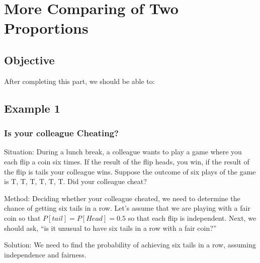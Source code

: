 \documentclass[11pt, chapterprefix=true]{scrbook}\usepackage[]{graphicx}\usepackage[]{color}
\begin{document}
\onecolumn



\chapter{More Comparing of Two Proportions} 

\label{chap:ch10}

\section{Objective}

After completing this part, we should be able to:

\vspace{1mm}



\section{Example 1}

\subsection{Is your colleague Cheating?}

Situation: During a lunch break, a colleague wants to play a game where you each flip a coin six times.  If the result of the flip heads, you win, if the result of the flip is tails your colleague wins.  Suppose the outcome of six plays of the game is T, T, T, T, T, T.  Did your colleague cheat?

Method: Deciding whether your colleague cheated, we need to determine the chance of getting six tails in a row. Let's assume that we are playing with a fair coin so that $P[tail] = P[Head] = 0.5$ so that each flip is independent.  Next, we should ask, ``is it unusual to have six tails in a row with a fair coin?''

Solution: We need to find the probability of achieving six tails in a row, assuming independence and fairness.
\end{document}
